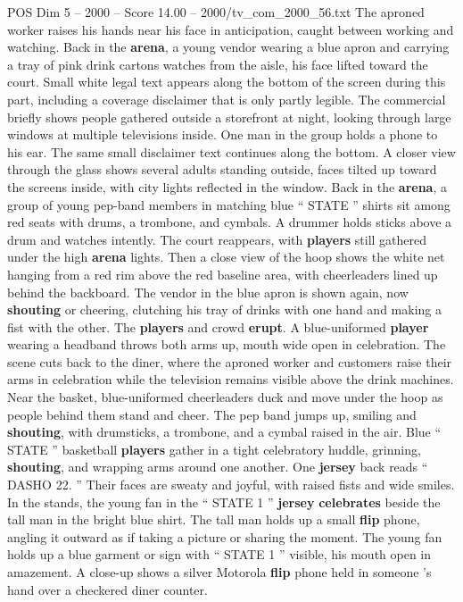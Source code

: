 \begin{textsample}{POS Dim 5 – 2000 – Score 14.00 – 2000/tv\_com\_2000\_56.txt}
The aproned worker raises his hands near his face in anticipation, caught between working and watching.
Back in the \textbf{arena}, a young vendor wearing a blue apron and carrying a tray of pink drink cartons watches from the aisle, his face lifted toward the court.
Small white legal text appears along the bottom of the screen during this part, including a coverage disclaimer that is only partly legible.
The commercial briefly shows people gathered outside a storefront at night, looking through large windows at multiple televisions inside.
One man in the group holds a phone to his ear.
The same small disclaimer text continues along the bottom.
A closer view through the glass shows several adults standing outside, faces tilted up toward the screens inside, with city lights reflected in the window.
Back in the \textbf{arena}, a group of young pep-band members in matching blue “ STATE ” shirts sit among red seats with drums, a trombone, and cymbals.
A drummer holds sticks above a drum and watches intently.
The court reappears, with \textbf{players} still gathered under the high \textbf{arena} lights.
Then a close view of the hoop shows the white net hanging from a red rim above the red baseline area, with cheerleaders lined up behind the backboard.
The vendor in the blue apron is shown again, now \textbf{shouting} or cheering, clutching his tray of drinks with one hand and making a fist with the other.
The \textbf{players} and crowd \textbf{erupt}.
A blue-uniformed \textbf{player} wearing a headband throws both arms up, mouth wide open in celebration.
The scene cuts back to the diner, where the aproned worker and customers raise their arms in celebration while the television remains visible above the drink machines.
Near the basket, blue-uniformed cheerleaders duck and move under the hoop as people behind them stand and cheer.
The pep band jumps up, smiling and \textbf{shouting}, with drumsticks, a trombone, and a cymbal raised in the air.
Blue “ STATE ” basketball \textbf{players} gather in a tight celebratory huddle, grinning, \textbf{shouting}, and wrapping arms around one another.
One \textbf{jersey} back reads “ DASHO 22. ” Their faces are sweaty and joyful, with raised fists and wide smiles.
In the stands, the young fan in the “ STATE 1 ” \textbf{jersey} \textbf{celebrates} beside the tall man in the bright blue shirt.
The tall man holds up a small \textbf{flip} phone, angling it outward as if taking a picture or sharing the moment.
The young fan holds up a blue garment or sign with “ STATE 1 ” visible, his mouth open in amazement.
A close-up shows a silver Motorola \textbf{flip} phone held in someone ’s hand over a checkered diner counter.

\end{textsample}
